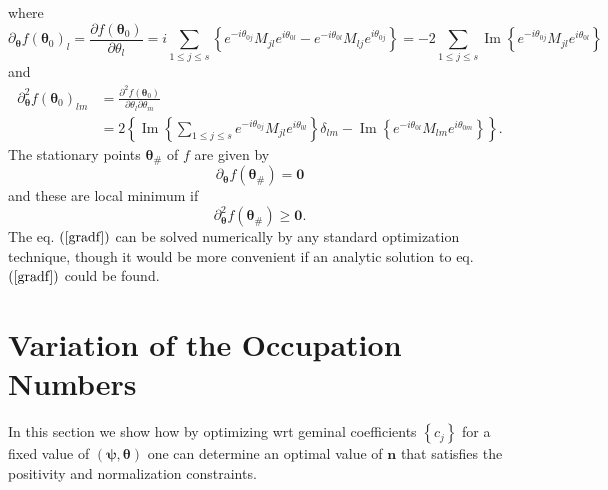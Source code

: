 \documentclass[aps,preprint]{revtex4}%
\begin{document}
where
\begin{equation}
\partial_{\mathbf{\theta}}f\left(  \mathbf{\theta}_{0}\right)  _{l}%
=\frac{\partial f\left(  \mathbf{\theta}_{0}\right)  }{\partial\theta_{l}%
}=i\sum_{1\leq j\leq s}\left\{  e^{-i\theta_{0j}}M_{jl}e^{i\theta_{0l}%
}-e^{-i\theta_{0l}}M_{lj}e^{i\theta_{0j}}\right\}  =-2\sum_{1\leq j\leq
s}\operatorname{Im}\left\{  e^{-i\theta_{0j}}M_{jl}e^{i\theta_{0l}}\right\}
\end{equation}
and
\begin{align}
\partial_{\mathbf{\theta}}^{2}f\left(  \mathbf{\theta}_{0}\right)  _{lm}  &
=\frac{\partial^{2}f\left(  \mathbf{\theta}_{0}\right)  }{\partial\theta
_{l}\partial\theta_{m}}\nonumber\\
&  =2\left\{  \operatorname{Im}\left\{  \sum_{1\leq j\leq s}e^{-i\theta_{0j}%
}M_{jl}e^{i\theta_{0l}}\right\}  \delta_{lm}-\operatorname{Im}\left\{
e^{-i\theta_{0l}}M_{lm}e^{i\theta_{0m}}\right\}  \right\}  .
\end{align}
The stationary points $\mathbf{\theta}_{\#}$ of $f$ are given by
\begin{equation}
\partial_{\mathbf{\theta}}f\left(  \mathbf{\theta}_{\#}\right)  =\mathbf{0}
\label{gradf}%
\end{equation}
and these are local minimum if
\begin{equation}
\partial_{\mathbf{\theta}}^{2}f\left(  \mathbf{\theta}_{\#}\right)
\geq\mathbf{0.}%
\end{equation}
The eq. $\left(  \ref{gradf}\right)  $ can be solved numerically by any
standard optimization technique, though it would be more convenient if an
analytic solution to eq. $\left(  \ref{gradf}\right)  $ could be found.

\section{Variation of the Occupation Numbers\label{OccVar}}

In this section we show how by optimizing wrt geminal coefficients $\left\{
c_{j}\right\}  $ for a fixed value of $\left(  \mathbf{\mathbf{\psi},\theta
}\right)  $ one can determine an optimal value of $\mathbf{n}$ that satisfies
the positivity and normalization constraints.
\end{document}
